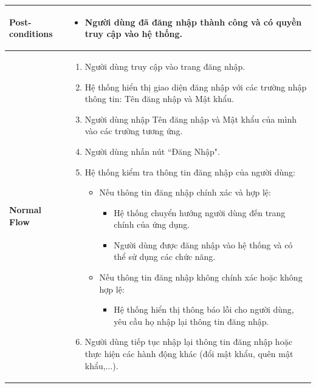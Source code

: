 \begin{longtable}[H]{|l|p{}|}
    \hline
        \textbf{Post-conditions} & \vspace{-0.75cm}  \begin{itemize} [leftmargin=4mm]
            \setlength\itemsep{0em}
            \item Người dùng đã đăng nhập thành công và có quyền truy cập vào hệ thống.
        \end{itemize} \\
    \hline
        \textbf{Normal Flow} & \vspace{-0.75cm} \begin{enumerate}[leftmargin=5.5mm]
            \setlength\itemsep{0em}
            \item Người dùng truy cập vào trang đăng nhập.
            \item Hệ thống hiển thị giao diện đăng nhập với các trường nhập thông tin: Tên đăng nhập và Mật khẩu.
            \item Người dùng nhập Tên đăng nhập và Mật khẩu của mình vào các trường tương ứng.
            \item Người dùng nhấn nút ``Đăng Nhập".
            \item Hệ thống kiểm tra thông tin đăng nhập của người dùng:
                \begin{itemize}
                    \item Nếu thông tin đăng nhập chính xác và hợp lệ:
                        \begin{itemize}
                            \item Hệ thống chuyển hướng người dùng đến trang chính của ứng dụng.
                            \item Người dùng được đăng nhập vào hệ thống và có thể sử dụng các chức năng.
                        \end{itemize}
                    \item Nếu thông tin đăng nhập không chính xác hoặc không hợp lệ:
                        \begin{itemize}
                            \item Hệ thống hiển thị thông báo lỗi cho người dùng, yêu cầu họ nhập lại thông tin đăng nhập.
                        \end{itemize}
                \end{itemize}
            \item Người dùng tiếp tục nhập lại thông tin đăng nhập hoặc thực hiện các hành động khác (đổi mật khẩu, quên mật khẩu,...).
        \end{enumerate} \\

\end{longtable}
